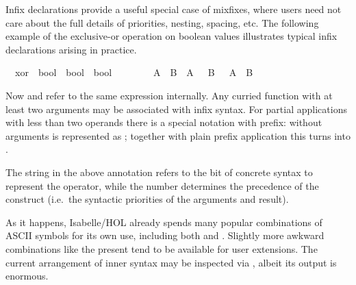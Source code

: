 \begin{isabellebody}
\begin{isamarkuptext}
  Infix declarations provide a useful special
  case of mixfixes, where users need not care about the full details
  of priorities, nesting, spacing, etc.  The following example of the
  exclusive-or operation on boolean values illustrates typical infix
  declarations arising in practice.%
\end{isamarkuptext}%
\isamarkuptrue%
\isanewline
\ \ xor\ {\isacharcolon}{\isacharcolon}\ {\isachardoublequote}bool\ {\isasymRightarrow}\ bool\ {\isasymRightarrow}\ bool{\isachardoublequote}\ \ \ \ {\isacharparenleft}\ {\isachardoublequote}{\isacharbrackleft}{\isacharplus}{\isacharbrackright}{\isachardoublequote}\ {}{}{\isacharparenright}\isanewline
\ \ {\isachardoublequote}A\ {\isacharbrackleft}{\isacharplus}{\isacharbrackright}\ B\ {\isasymequiv}\ {\isacharparenleft}A\ {\isasymand}\ {\isasymnot}\ B{\isacharparenright}\ {\isasymor}\ {\isacharparenleft}{\isasymnot}\ A\ {\isasymand}\ B{\isacharparenright}{\isachardoublequote}\isamarkupfalse%
%
\begin{isamarkuptext}%
\noindent Now  and  refer to the
  same expression internally.  Any curried function with at least two
  arguments may be associated with infix syntax.  For partial
  applications with less than two operands there is a special notation
  with  prefix:  without arguments is represented
  as ; together with plain prefix application this
  turns  into .

  \medskip The string \isa{{\isachardoublequote}{\isacharbrackleft}{\isacharplus}{\isacharbrackright}{\isachardoublequote}} in the above annotation
  refers to the bit of concrete syntax to represent the operator,
  while the number  determines the precedence of the
  construct (i.e.\ the syntactic priorities of the arguments and
  result).

  As it happens, Isabelle/HOL already spends many popular combinations
  of ASCII symbols for its own use, including both \isa{{\isacharplus}} and
  \isa{{\isacharplus}{\isacharplus}}.  Slightly more awkward combinations like the present
  \isa{{\isacharbrackleft}{\isacharplus}{\isacharbrackright}} tend to be available for user extensions.  The current
  arrangement of inner syntax may be inspected via
  , albeit its output is enormous.


\end{isamarkuptext}
\end{isabellebody}
